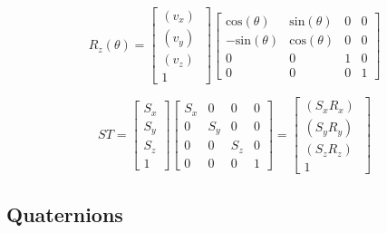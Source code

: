 \begin{equation}
R_z(\theta) = 
\begin{bmatrix}
(v_x)~ \\
(v_y)~ \\
(v_z)~ \\
1
\end{bmatrix}
\begin{bmatrix}
\text{cos}(\theta) 	& \text{sin}(\theta) 	& 0						& 0\\
-\text{sin}(\theta) & \text{cos}(\theta) 	& 0
					& 0\\
0 					& 0 					& 1						& 0\\
0 					& 0 					& 0 					& 1
\end{bmatrix}
\end{equation}


\begin{equation}
ST = \begin{bmatrix}
S_{x} \\
S_{y} \\
S_{z} \\
1
\end{bmatrix}
\begin{bmatrix}
S_x & 0 & 0 & 0\\
0 & S_y & 0 & 0\\
0 & 0 & S_z & 0\\
0  & 0  & 0 & 1
\end{bmatrix}
= \begin{bmatrix}
(S_x R_x)~ \\
(S_y R_y)~ \\
(S_z R_z)~ \\
1
\end{bmatrix}
\end{equation}

\subsection{Quaternions}

